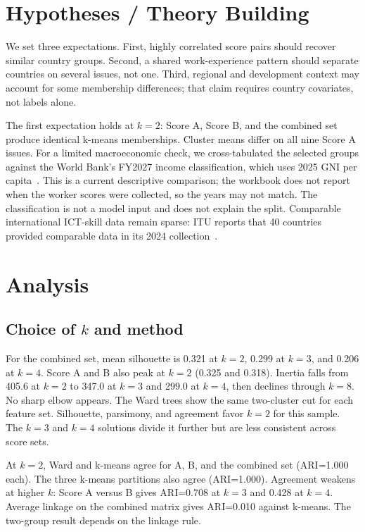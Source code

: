 \documentclass[9pt,twocolumn]{extarticle}
\begin{document}
\section{Hypotheses / Theory Building}
We set three expectations. First, highly correlated score pairs should recover similar country groups. Second, a shared work-experience pattern should separate countries on several issues, not one. Third, regional and development context may account for some membership differences; that claim requires country covariates, not labels alone.

The first expectation holds at $k=2$: Score A, Score B, and the combined set produce identical k-means memberships. Cluster means differ on all nine Score A issues. For a limited macroeconomic check, we cross-tabulated the selected groups against the World Bank's FY2027 income classification, which uses 2025 GNI per capita~\cite{wb}. This is a current descriptive comparison; the workbook does not report when the worker scores were collected, so the years may not match. The classification is not a model input and does not explain the split. Comparable international ICT-skill data remain sparse: ITU reports that 40 countries provided comparable data in its 2024 collection~\cite{itu}.

\section{Analysis}
\subsection{Choice of $k$ and method}
For the combined set, mean silhouette is 0.321 at $k=2$, 0.299 at $k=3$, and 0.206 at $k=4$. Score A and B also peak at $k=2$ (0.325 and 0.318). Inertia falls from 405.6 at $k=2$ to 347.0 at $k=3$ and 299.0 at $k=4$, then declines through $k=8$. No sharp elbow appears. The Ward trees show the same two-cluster cut for each feature set. Silhouette, parsimony, and agreement favor $k=2$ for this sample. The $k=3$ and $k=4$ solutions divide it further but are less consistent across score sets.

At $k=2$, Ward and k-means agree for A, B, and the combined set (ARI=1.000 each). The three k-means partitions also agree (ARI=1.000). Agreement weakens at higher $k$: Score A versus B gives ARI=0.708 at $k=3$ and 0.428 at $k=4$. Average linkage on the combined matrix gives ARI=0.010 against k-means. The two-group result depends on the linkage rule.
\end{document}
